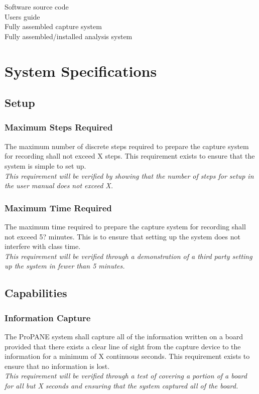 \documentclass[]{article}
\begin{document}
		Software source code\\
		Users guide\\
		Fully assembled capture system\\
		Fully assembled/installed analysis system\\
	
	\section{System Specifications}
		
		\subsection{Setup}
			
			\subsubsection{Maximum Steps Required}
				The maximum number of discrete steps required to prepare the capture system for recording shall not exceed X steps. This requirement exists to ensure that the system is simple to set up.\\
				\emph{This requirement will be verified by showing that the number of steps for setup in the user manual does not exceed X.}
				
			\subsubsection{Maximum Time Required}
				The maximum time required to prepare the capture system for recording shall not exceed 5? minutes. This is to ensure that setting up the system does not interfere with class time.\\
				\emph{This requirement will be verified through a demonstration of a third party setting up the system in fewer than 5 minutes.}
		
		
		\subsection{Capabilities}
		
			\subsubsection{Information Capture}
				The ProPANE system shall capture all of the information written on a board provided that there exists a clear line of sight from the capture device to the information for a minimum of X continuous seconds. This requirement exists to ensure that no information is lost.\\
				\emph{This requirement will be verified through a test of covering a portion of a board for all but X seconds and ensuring that the system captured all of the board. }
			
\end{document}

